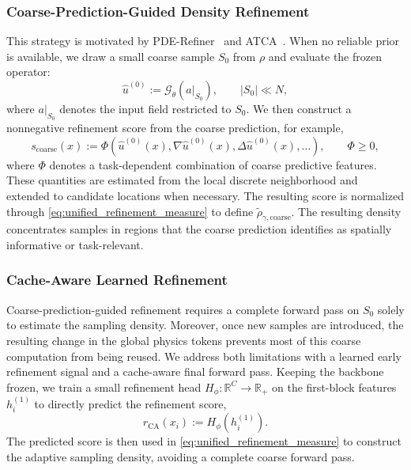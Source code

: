 \subsubsection{Coarse-Prediction-Guided Density Refinement}
\label{sec:coarse_prediction_refinement}

This strategy is motivated by PDE-Refiner~\citep{lippe2023pderefiner}
and ATCA~\citep{jenkins2026atca}. When no reliable prior is available,
we draw a small coarse sample $S_0$ from $\rho$ and evaluate the frozen
operator:
\begin{equation}
    \widehat{u}^{(0)}
    :=\mathcal{G}_{\theta}\!\left(a\big|_{S_0}\right),
    \qquad |S_0|\ll N,
    \label{eq:coarse_draft_prediction}
\end{equation}
where $a\big|_{S_0}$ denotes the input field restricted to $S_0$.
We then construct a nonnegative refinement score from the coarse prediction,
for example,
\begin{equation}
    s_{\mathrm{coarse}}(x)
    :=\Phi\!\left(
        \widehat{u}^{(0)}(x),
        \nabla\widehat{u}^{(0)}(x),
        \Delta\widehat{u}^{(0)}(x),
        \ldots
    \right),
    \qquad \Phi\geq0,
    \label{eq:coarse_refinement_score}
\end{equation}
where $\Phi$ denotes a task-dependent combination of coarse predictive
features. These quantities are estimated from the local discrete neighborhood
and extended to candidate locations when necessary. The resulting score is
normalized through \eqref{eq:unified_refinement_measure} to define
$\widetilde{\rho}_{\gamma,\mathrm{coarse}}$. The resulting density concentrates samples in regions that the coarse prediction
identifies as spatially informative or task-relevant.

\subsubsection{Cache-Aware Learned Refinement}
\label{sec:cache_aware_refinement}

Coarse-prediction-guided refinement requires a complete forward pass on
$S_0$ solely to estimate the sampling density. Moreover, once new samples are
introduced, the resulting change in the global physics tokens prevents most
of this coarse computation from being reused. We address both limitations with
a learned early refinement signal and a cache-aware final forward pass. Keeping the backbone frozen, we train a small refinement head
$H_\phi:\mathbb{R}^C\rightarrow\mathbb{R}_{+}$ on the first-block features
$h_i^{(1)}$ to directly predict the refinement score,
\begin{equation}
    r_{\mathrm{CA}}(x_i)
    := H_\phi\!\left(h_i^{(1)}\right).
    \label{eq:learned_refinement_score}
\end{equation}
The predicted score is then used in
\eqref{eq:unified_refinement_measure} to construct the adaptive sampling
density, avoiding a complete coarse forward pass.

